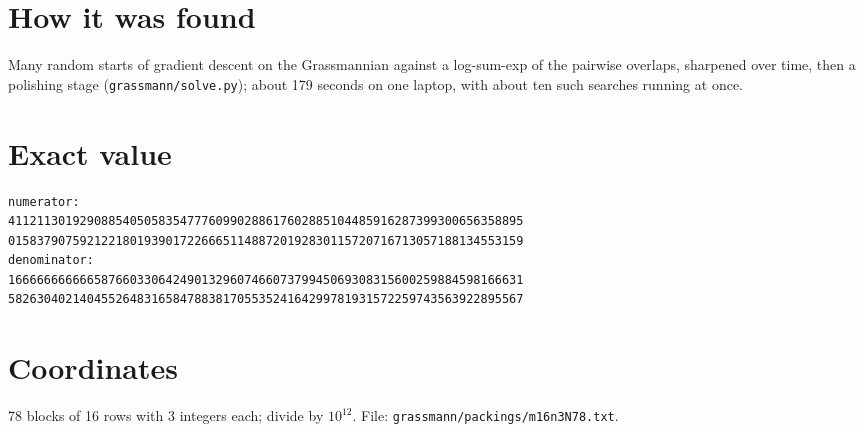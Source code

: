 \documentclass[11pt,a4paper]{article}
\begin{document}
\section{How it was found}
Many random starts of gradient descent on the Grassmannian against a log-sum-exp of the pairwise overlaps, sharpened over time, then a polishing stage (\texttt{grassmann/solve.py}); about 179 seconds on one laptop, with about ten such searches running at once.


\appendix
\section{Exact value}
{\small
\begin{verbatim}
numerator:
411211301929088540505835477760990288617602885104485916287399300656358895
015837907592122180193901722666511488720192830115720716713057188134553159
denominator:
166666666666587660330642490132960746607379945069308315600259884598166631
582630402140455264831658478838170553524164299781931572259743563922895567
\end{verbatim}}

\section{Coordinates}
78 blocks of 16 rows with 3 integers each; divide by $10^{12}$. File: \texttt{grassmann/packings/m16n3N78.txt}.
{\tiny
\begin{multicols}{3}
\end{multicols}}
\end{document}
